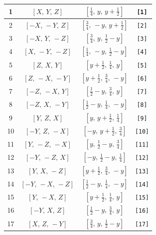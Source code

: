 \documentclass[fleqn,8pt]{jsarticle}
\begin{document}
\begin{longtable}{cccc}
1 & $\left[ X,\, Y,\, Z \right]$ & $\left[ \frac{1}{4},\, y,\, y + \frac{1}{2} \right]$ & {\tt [1]} \\ \hline
2 & $\left[ - X,\, - Y,\, Z \right]$ & $\left[ \frac{3}{4},\, - y,\, y + \frac{1}{2} \right]$ & {\tt [2]} \\ \hline
3 & $\left[ - X,\, Y,\, - Z \right]$ & $\left[ \frac{3}{4},\, y,\, \frac{1}{2} - y \right]$ & {\tt [3]} \\ \hline
4 & $\left[ X,\, - Y,\, - Z \right]$ & $\left[ \frac{1}{4},\, - y,\, \frac{1}{2} - y \right]$ & {\tt [4]} \\ \hline
5 & $\left[ Z,\, X,\, Y \right]$ & $\left[ y + \frac{1}{2},\, \frac{1}{4},\, y \right]$ & {\tt [5]} \\ \hline
6 & $\left[ Z,\, - X,\, - Y \right]$ & $\left[ y + \frac{1}{2},\, \frac{3}{4},\, - y \right]$ & {\tt [6]} \\ \hline
7 & $\left[ - Z,\, - X,\, Y \right]$ & $\left[ \frac{1}{2} - y,\, \frac{3}{4},\, y \right]$ & {\tt [7]} \\ \hline
8 & $\left[ - Z,\, X,\, - Y \right]$ & $\left[ \frac{1}{2} - y,\, \frac{1}{4},\, - y \right]$ & {\tt [8]} \\ \hline
9 & $\left[ Y,\, Z,\, X \right]$ & $\left[ y,\, y + \frac{1}{2},\, \frac{1}{4} \right]$ & {\tt [9]} \\ \hline
10 & $\left[ - Y,\, Z,\, - X \right]$ & $\left[ - y,\, y + \frac{1}{2},\, \frac{3}{4} \right]$ & {\tt [10]} \\ \hline
11 & $\left[ Y,\, - Z,\, - X \right]$ & $\left[ y,\, \frac{1}{2} - y,\, \frac{3}{4} \right]$ & {\tt [11]} \\ \hline
12 & $\left[ - Y,\, - Z,\, X \right]$ & $\left[ - y,\, \frac{1}{2} - y,\, \frac{1}{4} \right]$ & {\tt [12]} \\ \hline
13 & $\left[ Y,\, X,\, - Z \right]$ & $\left[ y + \frac{1}{2},\, \frac{3}{4},\, - y \right]$ & {\tt [13]} \\ \hline
14 & $\left[ - Y,\, - X,\, - Z \right]$ & $\left[ \frac{1}{2} - y,\, \frac{1}{4},\, - y \right]$ & {\tt [14]} \\ \hline
15 & $\left[ Y,\, - X,\, Z \right]$ & $\left[ y + \frac{1}{2},\, \frac{1}{4},\, y \right]$ & {\tt [15]} \\ \hline
16 & $\left[ - Y,\, X,\, Z \right]$ & $\left[ \frac{1}{2} - y,\, \frac{3}{4},\, y \right]$ & {\tt [16]} \\ \hline
17 & $\left[ X,\, Z,\, - Y \right]$ & $\left[ \frac{3}{4},\, y,\, \frac{1}{2} - y \right]$ & {\tt [17]} \\ \hline

\end{longtable}
\end{document}
